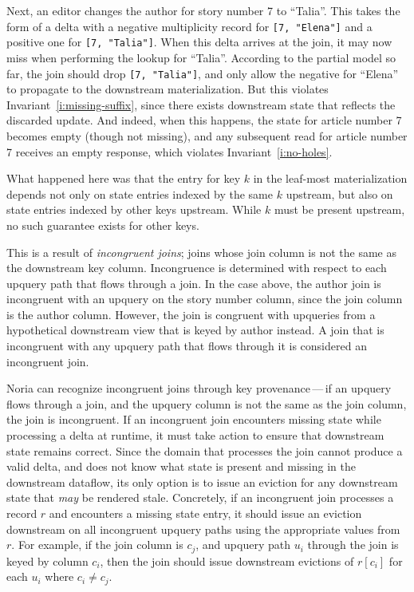 Next, an editor changes the author for story number 7 to ``Talia''. This
takes the form of a delta with a negative multiplicity record for \texttt{[7,
"Elena"]} and a positive one for \texttt{[7, "Talia"]}. When this delta arrives
at the join, it may now miss when performing the lookup for ``Talia''. According
to the partial model so far, the join should drop \texttt{[7, "Talia"]}, and
only allow the negative for ``Elena'' to propagate to the downstream
materialization. But this violates Invariant~\ref{i:missing-suffix}, since there
exists downstream state that reflects the discarded update. And indeed, when
this happens, the state for article number 7 becomes empty (though not missing),
and any subsequent read for article number 7 receives an empty response, which
violates Invariant~\ref{i:no-holes}.

What happened here was that the entry for key $k$ in the leaf-most
materialization depends not only on state entries indexed by the same $k$
upstream, but also on state entries indexed by other keys upstream. While $k$
must be present upstream, no such guarantee exists for other keys.

This is a result of \textit{incongruent joins}; joins whose join column is not
the same as the downstream key column. Incongruence is determined with respect
to each upquery path that flows through a join. In the case above, the author
join is incongruent with an upquery on the story number column, since the join
column is the author column. However, the join is congruent with upqueries from
a hypothetical downstream view that is keyed by author instead. A join that is
incongruent with any upquery path that flows through it is considered an
incongruent join.

Noria can recognize incongruent joins through key provenance\,---\,if an upquery
flows through a join, and the upquery column is not the same as the join column,
the join is incongruent. If an incongruent join encounters missing state while
processing a delta at runtime, it must take action to ensure that downstream
state remains correct. Since the domain that processes the join cannot produce a
valid delta, and does not know what state is present and missing in the
downstream dataflow, its only option is to issue an eviction for any downstream
state that \emph{may} be rendered stale. Concretely, if an incongruent join
processes a record $r$ and encounters a missing state entry, it should issue an
eviction downstream on all incongruent upquery paths using the appropriate
values from $r$. For example, if the join column is $c_j$, and upquery path
$u_i$ through the join is keyed by column $c_i$, then the join should issue
downstream evictions of $r[c_i]$ for each $u_i$ where $c_i \neq c_j$.

